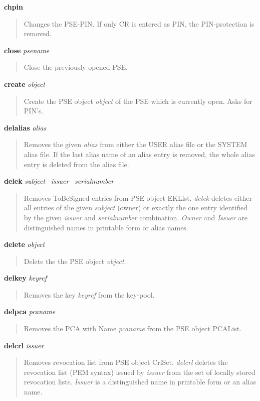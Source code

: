 {\bf chpin}
\begin{quote}
Changes the PSE-PIN. If only CR is entered as PIN, the PIN-protection is removed.
\end{quote}

{\bf close} {\em psename}
\begin{quote}
Close the previously opened PSE.
\end{quote}

{\bf create} {\em object}
\begin{quote}
Create the PSE object {\em object}
of the PSE which is currently open. Asks for PIN's.
\end{quote}

{\bf delalias} {\em alias}
\begin{quote}
Removes the given {\em alias} from either the USER alias file or the SYSTEM alias file. If the
last alias name of an alias entry is removed, the whole alias entry is deleted from the alias file.
\end{quote}

{\bf delek} {\em subject}~ {\em issuer}~ {\em serialnumber}
\begin{quote}
Removes ToBeSigned entries from PSE object EKList.
{\em delek} deletes either all entries of the given {\em subject} (owner) or exactly the one entry identified by 
the
given {\em issuer} and {\em serialnumber} combination. {\em Owner} and {\em Issuer} are distinguished
names in printable form or alias names.
\end{quote}

{\bf delete} {\em object}
\begin{quote}
Delete the the PSE object {\em object}. 
\end{quote}

{\bf delkey} {\em keyref} 
\begin{quote}
Removes the key {\em keyref} from the key-pool.
\end{quote}

{\bf delpca} {\em pcaname} 
\begin{quote}
Removes the PCA with Name {\em pcaname} from the PSE object PCAList.
\end{quote}

{\bf delcrl} {\em issuer}
\begin{quote}
Removes revocation list from PSE object CrlSet.
{\em delcrl} deletes the revocation list (PEM syntax) issued by {\em issuer} from the set of 
locally stored revocation lists. {\em Issuer} is a distinguished name in printable form or an alias name.
\end{quote}

